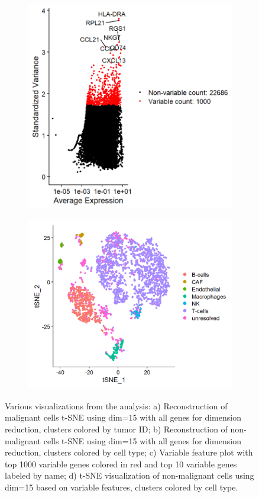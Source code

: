 \documentclass[11pt]{article}
\begin{document}
\begin{figure}
\begin{subfigure}{.5\textwidth}
      \includegraphics[width=.9\linewidth]{plots/plot_vf-top10.png}
      \caption{}
      \label{fig:vf-top10}
    \end{subfigure}
    \begin{subfigure}{.5\textwidth}
      \centering
      \includegraphics[width=.9\linewidth]{plots/plot_nm-tsne-vf-cell.png}
      \caption{}
      \label{fig:nm-tsne-vf}
    \end{subfigure}
    \caption{Various visualizations from the analysis: a) Reconstruction of malignant cells t-SNE using dim=15 with all genes for dimension reduction, clusters colored by tumor ID; b) Reconstruction of non-malignant cells t-SNE using dim=15 with all genes for dimension reduction, clusters colored by cell type; c) Variable feature plot with top 1000 variable genes colored in red and top 10 variable genes labeled by name; d) t-SNE visualization of non-malignant cells using dim=15 based on variable features, clusters colored by cell type.}
    \label{fig:dim-red-figures}
\end{figure}
\end{document}
